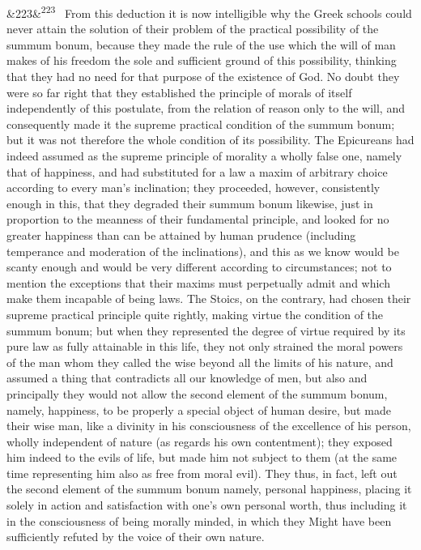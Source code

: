 \documentclass[12pt]{article}
\newcommand{\para}[1][]{\par\noindent\ifx&#1&\else\textsuperscript{\footnotesize #1}~\fi}
\begin{document}
\para[223] From this deduction it is now intelligible why the Greek schools could never attain the solution of their problem of the practical possibility of the summum bonum, because they made the rule of the use which the will of man makes of his freedom the sole and sufficient ground of this possibility, thinking that they had no need for that purpose of the existence of God. No doubt they were so far right that they established the principle of morals of itself independently of this postulate, from the relation of reason only to the will, and consequently made it the supreme practical condition of the summum bonum; but it was not therefore the whole condition of its possibility. The Epicureans had indeed assumed as the supreme principle of morality a wholly false one, namely that of happiness, and had substituted for a law a maxim of arbitrary choice according to every man's inclination; they proceeded, however, consistently enough in this, that they degraded their summum bonum likewise, just in proportion to the meanness of their fundamental principle, and looked for no greater happiness than can be attained by human prudence (including temperance and moderation of the inclinations), and this as we know would be scanty enough and would be very different according to circumstances; not to mention the exceptions that their maxims must perpetually admit and which make them incapable of being laws. The Stoics, on the contrary, had chosen their supreme practical principle quite rightly, making virtue the condition of the summum bonum; but when they represented the degree of virtue required by its pure law as fully attainable in this life, they not only strained the moral powers of the man whom they called the wise beyond all the limits of his nature, and assumed a thing that contradicts all our knowledge of men, but also and principally they would not allow the second element of the summum bonum, namely, happiness, to be properly a special object of human desire, but made their wise man, like a divinity in his consciousness of the excellence of his person, wholly independent of nature (as regards his own contentment); they exposed him indeed to the evils of life, but made him not subject to them (at the same time representing him also as free from moral evil). They thus, in fact, left out the second element of the summum bonum namely, personal happiness, placing it solely in action and satisfaction with one's own personal worth, thus including it in the consciousness of being morally minded, in which they Might have been sufficiently refuted by the voice of their own nature.
\end{document}
